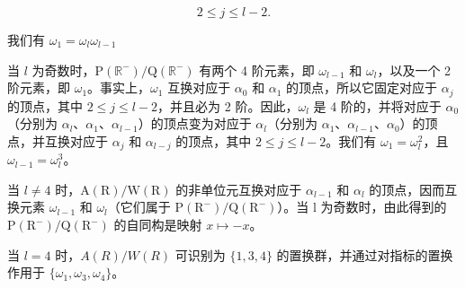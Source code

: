 \[
2 \leqslant j \leqslant l - 2.
\]

我们有 \(\omega_{1} = \omega_{l}\omega_{l - 1}\)

当 \(l\) 为奇数时，\(\mathrm{P}(\mathbb{R}^{-}) / \mathrm{Q}(\mathbb{R}^{-})\) 有两个 4 阶元素，即 \(\omega_{l-1}\) 和 \(\omega_l\)，以及一个 2 阶元素，即 \(\omega_1\)。事实上，\(\omega_1\) 互换对应于 \(\alpha_0\) 和 \(\alpha_1\) 的顶点，所以它固定对应于 \(\alpha_j\) 的顶点，其中 \(2 \leqslant j \leqslant l-2\)，并且必为 2 阶。因此，\(\omega_l\) 是 4 阶的，并将对应于 \(\alpha_0\)（分别为 \(\alpha_l\)、\(\alpha_1\)、\(\alpha_{l-1}\)）的顶点变为对应于 \(\alpha_l\)（分别为 \(\alpha_1\)、\(\alpha_{l-1}\)、\(\alpha_0\)）的顶点，并互换对应于 \(\alpha_j\) 和 \(\alpha_{l-j}\) 的顶点，其中 \(2 \leqslant j \leqslant l-2\)。我们有 \(\omega_1 = \omega_l^2\)，且 \(\omega_{l-1} = \omega_l^3\)。

当 \(l \neq 4\) 时，\(\mathrm{A}(\mathrm{R})/\mathrm{W}(\mathrm{R})\) 的非单位元互换对应于 \(\alpha_{l-1}\) 和 \(\alpha_{l}\) 的顶点，因而互换元素 \(\omega_{l-1}\) 和 \(\omega_{l}\)（它们属于 \(\mathrm{P}(\mathrm{R}^{-})/\mathrm{Q}(\mathrm{R}^{-})\)）。当 l 为奇数时，由此得到的 \(\mathrm{P}(\mathrm{R}^{-})/\mathrm{Q}(\mathrm{R}^{-})\) 的自同构是映射 \(x \mapsto -x\)。

当 \(l = 4\) 时，\(A(R)/W(R)\) 可识别为 \(\{1,3,4\}\) 的置换群，并通过对指标的置换作用于 \(\{\omega_1,\omega_3,\omega_4\}\)。

